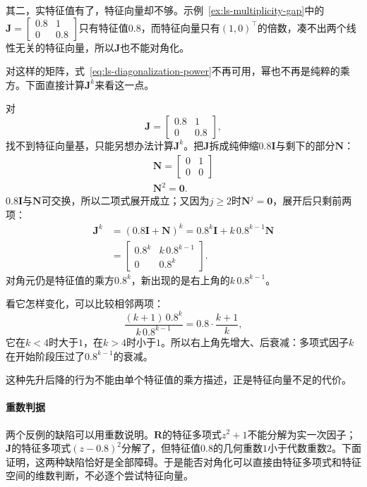 其二，实特征值有了，特征向量却不够。示例~\ref{ex:ls-multiplicity-gap}中的$\bm J=\left[\begin{smallmatrix}0.8&1\\0&0.8\end{smallmatrix}\right]$只有特征值$0.8$，而特征向量只有$(1,0)^{\top}$的倍数，凑不出两个线性无关的特征向量，所以$\bm J$也不能对角化。

对这样的矩阵，式~\eqref{eq:ls-diagonalization-power}不再可用，幂也不再是纯粹的乘方。下面直接计算$\bm J^k$来看这一点。
\begin{example}[不能对角化矩阵的幂]
\label{ex:ls-jordan-block-power}
对
\[
 \bm J=\begin{bmatrix}0.8&1\\0&0.8\end{bmatrix},
\]
找不到特征向量基，只能另想办法计算$\bm J^k$。把$\bm J$拆成纯伸缩$0.8\bm I$与剩下的部分$\bm N$：
\[
\begin{gathered}
\bm N=\begin{bmatrix}0&1\\0&0\end{bmatrix}\\
\bm N^2=\bm0 .
\end{gathered}
\]
$0.8\bm I$与$\bm N$可交换，所以二项式展开成立；又因为$j\geq2$时$\bm N^j=\bm0$，展开后只剩前两项：
\[
 \begin{aligned}
 \bm J^k&=(0.8\bm I+\bm N)^k=0.8^k\bm I+k\,0.8^{k-1}\bm N\\
 &=\begin{bmatrix}0.8^k&k\,0.8^{k-1}\\0&0.8^k\end{bmatrix}.
 \end{aligned}
\]
对角元仍是特征值的乘方$0.8^k$，新出现的是右上角的$k\,0.8^{k-1}$。

看它怎样变化，可以比较相邻两项：
\[
 \frac{(k+1)\,0.8^{k}}{k\,0.8^{k-1}}=0.8\cdot\frac{k+1}{k},
\]
它在$k<4$时大于$1$，在$k>4$时小于$1$。所以右上角先增大、后衰减：多项式因子$k$在开始阶段压过了$0.8^{k-1}$的衰减。

这种先升后降的行为不能由单个特征值的乘方描述，正是特征向量不足的代价。
\end{example}

\paragraph{重数判据}
两个反例的缺陷可以用重数说明。$\bm R$的特征多项式$z^2+1$不能分解为实一次因子；$\bm J$的特征多项式$(z-0.8)^2$分解了，但特征值$0.8$的几何重数$1$小于代数重数$2$。下面证明，这两种缺陷恰好是全部障碍。于是能否对角化可以直接由特征多项式和特征空间的维数判断，不必逐个尝试特征向量。

